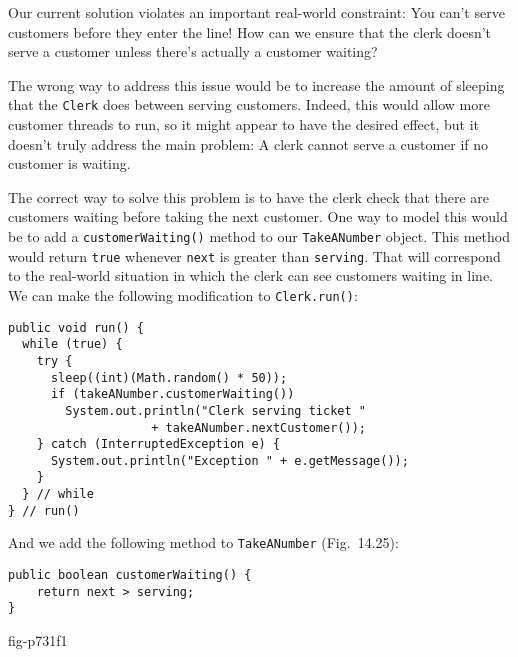 \noindent Our current solution violates an important
real-world constraint: You can't serve customers before they enter the
line! How can we ensure that the clerk doesn't serve a customer unless
there's actually a customer waiting?

The wrong way to address this issue would be to increase the amount of
sleeping that the {\tt Clerk} does between serving customers.  Indeed,
this would allow more customer threads to run, so it might appear to
have the desired effect, but it doesn't truly address the main
problem: A clerk cannot serve a customer if no customer is waiting.

The correct way to solve this problem is to have the clerk check that
there are customers waiting before taking the next customer.   One way
to model this would be to add a {\tt customerWaiting()} method to our
{\tt TakeANumber} object.   This method would return {\tt true}
whenever {\tt next} is greater than {\tt serving}. That will
correspond to the real-world situation in which the clerk can see
customers waiting in line.  We can make the following
modification to {\tt Clerk.run()}:

\begin{jjjlisting}
\begin{lstlisting}
public void run() {
  while (true) {
    try {
      sleep((int)(Math.random() * 50));
      if (takeANumber.customerWaiting())    
        System.out.println("Clerk serving ticket " 
                    + takeANumber.nextCustomer());
    } catch (InterruptedException e) {
      System.out.println("Exception " + e.getMessage());
    }
  } // while
} // run()
\end{lstlisting}
\end{jjjlisting}

\noindent And we add the following method to {\tt TakeANumber} 
(Fig.~14.25):

\begin{jjjlisting}
\begin{lstlisting}
public boolean customerWaiting() {
    return next > serving;
}
\end{lstlisting}
\end{jjjlisting}
{fig-p731f1}


